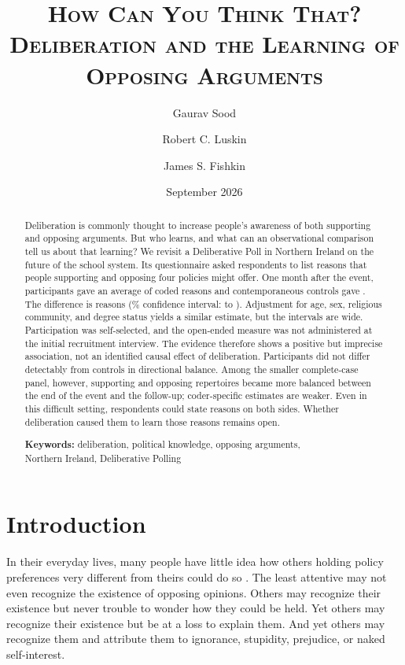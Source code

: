 \documentclass[11pt]{article}
\title{\scshape How Can You Think That?\\Deliberation and the Learning of Opposing Arguments}
\author{Gaurav Sood \and Robert C. Luskin \and James S. Fishkin}
\date{September 2026}
\begin{document}
\maketitle

\begin{abstract}
Deliberation is commonly thought to increase people's awareness of both supporting and
opposing arguments. But who learns, and what can an observational comparison tell us about
that learning? We revisit a Deliberative Poll in Northern Ireland on the future of the school
system. Its questionnaire asked respondents to list reasons that people supporting and opposing
four policies might offer. One month after the event, participants gave an average of
\ParticipantTthreeMean{} coded reasons and contemporaneous controls gave \ControlMean{}.
The difference is \MainDifference{} reasons (\ConfidenceLevel\% confidence interval: \MainLow{} to
\MainHigh{}). Adjustment for age, sex, religious community, and degree status yields a similar
estimate, but the intervals are wide. Participation was self-selected, and the open-ended
measure was not administered at the initial recruitment interview. The evidence therefore
shows a positive but imprecise association, not an identified causal effect of deliberation.
Participants did not differ detectably from controls in directional balance. Among the smaller
complete-case panel, however, supporting and opposing repertoires became more balanced between
the end of the event and the follow-up; coder-specific estimates are weaker. Even in this
difficult setting, respondents could state reasons on both sides. Whether deliberation caused
them to learn those reasons remains open.

\medskip
\noindent\textbf{Keywords:} deliberation, political knowledge, opposing arguments,
\\Northern Ireland, Deliberative Polling
\end{abstract}

\newpage
\section{Introduction}

In their everyday lives, many people have little idea how others holding policy preferences
very different from theirs could do so \citep{mutz2002cross}. The least attentive may not even
recognize the existence of opposing opinions. Others may recognize their existence but never
trouble to wonder how they could be held. Yet others may recognize their existence but be at a
loss to explain them. And yet others may recognize them and attribute them to ignorance,
stupidity, prejudice, or naked self-interest.
\end{document}
